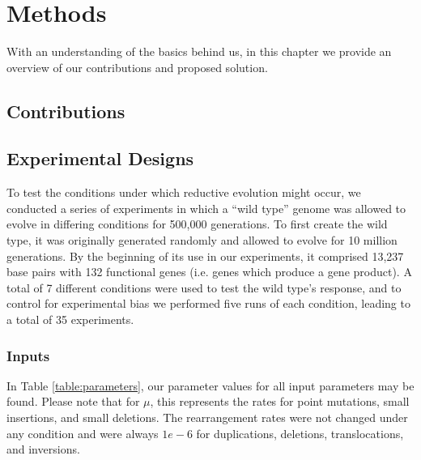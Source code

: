 \chapter{Methods}\label{ch:methods}
With an understanding of the basics behind us, in this chapter we provide an overview of our contributions and proposed solution.

\section{Contributions}

\section{Experimental Designs} \label{experimental_design}
To test the conditions under which reductive evolution might occur, we conducted a series of experiments in which a ``wild type'' genome was allowed to evolve in differing conditions for 500,000 generations. To first create the wild type, it was originally generated randomly and allowed to evolve for 10 million generations. By the beginning of its use in our experiments, it comprised 13,237 base pairs with 132 functional genes (i.e. genes which produce a gene product).  A total of 7 different conditions were used to test the wild type's response, and to control for experimental bias we performed five runs of each condition, leading to a total of 35 experiments. 

\subsection{Inputs}
In Table \ref{table:parameters}, our parameter values for all input parameters may be found. Please note that for $\mu$, this represents the rates for point mutations, small insertions, and small deletions. The rearrangement rates were not changed under any condition and were always $1e-6$ for duplications, deletions, translocations, and inversions. 

